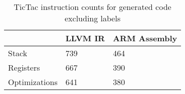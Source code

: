 \begin{table}[h!]
\centering
\begin{tabular}{p{}p{}p{}}
  \hline
 & LLVM IR & ARM Assembly \\ 
  \hline
Stack & 739 & 464 \\ 
  Registers & 667 & 390 \\ 
  Optimizations & 641 & 380 \\ 
   \hline
\end{tabular}
\caption{TicTac instruction counts for generated code excluding labels}
\end{table}
